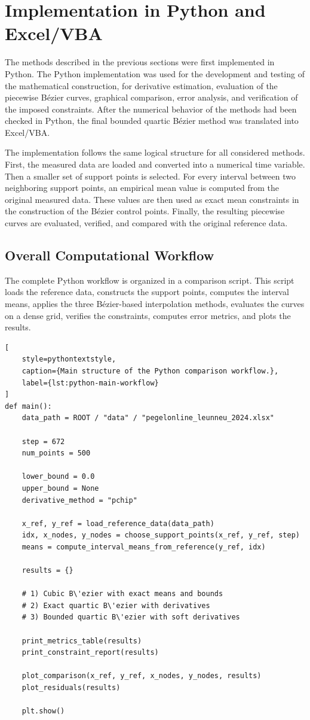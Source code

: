 \documentclass[12pt,a4paper]{article}
\begin{document}
\section{Implementation in Python and Excel/VBA}

The methods described in the previous sections were first implemented in
Python. The Python implementation was used for the development and testing
of the mathematical construction, for derivative estimation, evaluation of
the piecewise B\'ezier curves, graphical comparison, error analysis, and
verification of the imposed constraints. After the numerical behavior of the
methods had been checked in Python, the final bounded quartic B\'ezier
method was translated into Excel/VBA.

The implementation follows the same logical structure for all considered
methods. First, the measured data are loaded and converted into a numerical
time variable. Then a smaller set of support points is selected. For every
interval between two neighboring support points, an empirical mean value is
computed from the original measured data. These values are then used as
exact mean constraints in the construction of the B\'ezier control points.
Finally, the resulting piecewise curves are evaluated, verified, and compared
with the original reference data.

\subsection{Overall Computational Workflow}

The complete Python workflow is organized in a comparison script. This script
loads the reference data, constructs the support points, computes the interval
means, applies the three B\'ezier-based interpolation methods, evaluates the
curves on a dense grid, verifies the constraints, computes error metrics, and
plots the results.

\begin{lstlisting}[
    style=pythontextstyle,
    caption={Main structure of the Python comparison workflow.},
    label={lst:python-main-workflow}
]
def main():
    data_path = ROOT / "data" / "pegelonline_leunneu_2024.xlsx"

    step = 672
    num_points = 500

    lower_bound = 0.0
    upper_bound = None
    derivative_method = "pchip"

    x_ref, y_ref = load_reference_data(data_path)
    idx, x_nodes, y_nodes = choose_support_points(x_ref, y_ref, step)
    means = compute_interval_means_from_reference(y_ref, idx)

    results = {}

    # 1) Cubic B\'ezier with exact means and bounds
    # 2) Exact quartic B\'ezier with derivatives
    # 3) Bounded quartic B\'ezier with soft derivatives

    print_metrics_table(results)
    print_constraint_report(results)

    plot_comparison(x_ref, y_ref, x_nodes, y_nodes, results)
    plot_residuals(results)

    plt.show()
\end{lstlisting}
\end{document}
